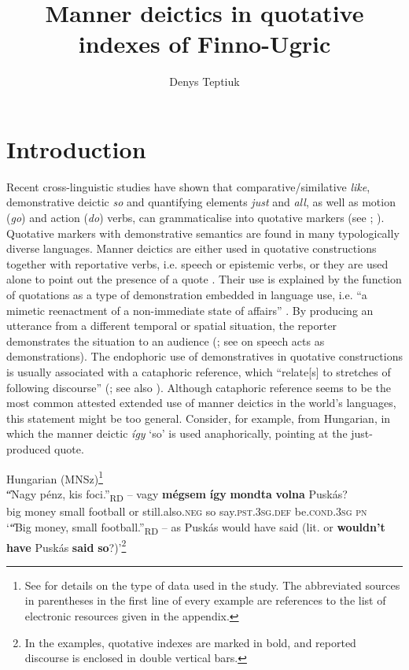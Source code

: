 \documentclass[output=paper,colorlinks,citecolor=brown]{langscibook}
\author{Denys Teptiuk\affiliation{University of Tartu}\orcid{}}
\title{Manner deictics in quotative indexes of Finno-Ugric}
\begin{document}
\maketitle 


\section{Introduction}\label{sec:teptiuk:1}

Recent cross-linguistic studies have shown that comparative/similative \textit{like}, demonstrative deictic \textit{so} and quantifying elements \textit{just} and \textit{all}, as well as motion (\textit{go}) and action (\textit{do}) verbs, can grammaticalise into quotative markers (see \citealt[xii-xiv]{BuchstallerVanAlphen2012}; \citealt[§ 5.1.2-5.1.5]{Güldemann2008}). Quotative markers with demonstrative semantics are found in many typologically diverse languages. Manner deictics are either used in quotative constructions together with reportative verbs, i.e. speech or epistemic verbs, or they are used alone to point out the presence of a quote \citep[321, 350]{Güldemann2008}. Their use is explained by the function of quotations as a type of demonstration embedded in language use, i.e. “a mimetic reenactment of a non-immediate state of affairs” \citep[320]{Güldemann2008}. By producing an utterance from a different temporal or spatial situation, the reporter demonstrates the situation to an audience (\citealt[802]{ClarkGerrig1990}; see \citealt{Clark2016} on speech acts as demonstrations). The endophoric use of demonstratives in quotative constructions is usually associated with a cataphoric reference, which “relate[s] to stretches of following discourse” (\citealt[297]{KönigUmbach2018}; see also \citealt{Güldemann2008}). Although cataphoric reference seems to be the most common attested extended use of manner deictics in the world’s languages, this statement might be too general. Consider, for example,  from Hungarian, in which the manner deictic \textit{így} ‘so’ is used anaphorically, pointing at the just-produced quote.

\ea\label{ex:teptiuk:1}
Hungarian (MNSz)\footnote{See  for details on the type of data used in the study. The abbreviated sources in parentheses in the first line of every example are references to the list of electronic resources given in the appendix.}\\
\gll \|“Nagy pénz, kis foci.”\|\textsubscript{RD} – vagy \textbf{mégsem} \textbf{így} \textbf{mondta} \textbf{volna} Puskás?\\
{\db}{\db}big money small football {} or still.also.\textsc{neg} so say.\textsc{pst}.3\textsc{sg}.\textsc{def} be\textsc{.cond.3sg} \textsc{pn}\\
\glt ‘\|“Big money, small football.”\|\textsubscript{RD} – as Puskás would have said (lit. or \textbf{wouldn’t} \textbf{have} Puskás \textbf{said} \textbf{so}?)’\footnote{In the examples, quotative indexes are marked in bold, and reported discourse is enclosed in double vertical bars.}
\z
\end{document}

